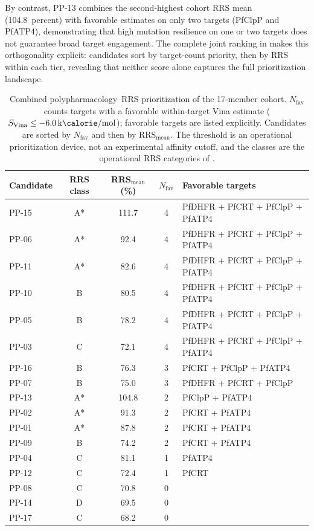 \documentclass[journal=jcisd8,manuscript=article]{achemso}
\begin{document}
By contrast, PP-13 combines the second-highest cohort RRS mean (\num{104.8}~percent) with favorable estimates on only two targets (PfClpP and PfATP4), demonstrating that high mutation resilience on one or two targets does not guarantee broad target engagement. The complete joint ranking in  makes this orthogonality explicit: candidates sort by target-count priority, then by RRS within each tier, revealing that neither score alone captures the full prioritization landscape.

\begin{table}[ht!]
\centering
\caption{Combined polypharmacology--RRS prioritization of the 17-member cohort. $N_{\mathrm{fav}}$ counts targets with a favorable within-target Vina estimate ($S_{\mathrm{Vina}}\leq\qty{-6.0}{\kilo\calorie\per\mole}$); favorable targets are listed explicitly. Candidates are sorted by $N_{\mathrm{fav}}$ and then by RRS$_{\mathrm{mean}}$. The threshold is an operational prioritization device, not an experimental affinity cutoff, and the classes are the operational RRS categories of .}
\label{tab:dual_priority}
\small
\begin{tabular}{@{}lcccl@{}}
\toprule
Candidate & RRS class & RRS$_{\mathrm{mean}}$ (\%) & $N_{\mathrm{fav}}$ & Favorable targets \\
\midrule
PP-15 & A* & \num{111.7} & 4 & PfDHFR + PfCRT + PfClpP + PfATP4 \\
PP-06 & A* & \num{92.4} & 4 & PfDHFR + PfCRT + PfClpP + PfATP4 \\
PP-11 & A* & \num{82.6} & 4 & PfDHFR + PfCRT + PfClpP + PfATP4 \\
PP-10 & B & \num{80.5} & 4 & PfDHFR + PfCRT + PfClpP + PfATP4 \\
PP-05 & B & \num{78.2} & 4 & PfDHFR + PfCRT + PfClpP + PfATP4 \\
PP-03 & C & \num{72.1} & 4 & PfDHFR + PfCRT + PfClpP + PfATP4 \\
PP-16 & B & \num{76.3} & 3 & PfCRT + PfClpP + PfATP4 \\
PP-07 & B & \num{75.0} & 3 & PfDHFR + PfCRT + PfClpP \\
PP-13 & A* & \num{104.8} & 2 & PfClpP + PfATP4 \\
PP-02 & A* & \num{91.3} & 2 & PfCRT + PfATP4 \\
PP-01 & A* & \num{87.8} & 2 & PfCRT + PfATP4 \\
PP-09 & B & \num{74.2} & 2 & PfCRT + PfATP4 \\
PP-04 & C & \num{81.1} & 1 & PfATP4 \\
PP-12 & C & \num{72.4} & 1 & PfCRT \\
PP-08 & C & \num{70.8} & 0 & \textemdash{} \\
PP-14 & D & \num{69.5} & 0 & \textemdash{} \\
PP-17 & C & \num{68.2} & 0 & \textemdash{} \\
\bottomrule
\end{tabular}
\end{table}
\end{document}
